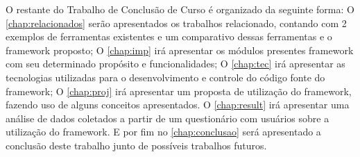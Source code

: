 O restante do Trabalho de Conclusão de Curso é organizado da seguinte forma:
O \autoref{chap:relacionados} serão apresentados os trabalhos relacionado, contando com 2 exemplos de ferramentas existentes e um comparativo dessas ferramentas e o framework proposto;
O \autoref{chap:imp} irá apresentar os módulos presentes framework com seu determinado propósito e funcionalidades;
O \autoref{chap:tec} irá apresentar as tecnologias utilizadas para o desenvolvimento e controle do código fonte do framework;
O \autoref{chap:proj} irá apresentar um proposta de utilização do framework, fazendo uso de alguns conceitos apresentados.
O \autoref{chap:result} irá apresentar uma análise de dados coletados a partir de um questionário com usuários sobre a utilização do framework.
E por fim no \autoref{chap:conclusao} será apresentado a conclusão deste trabalho junto de possíveis trabalhos futuros.